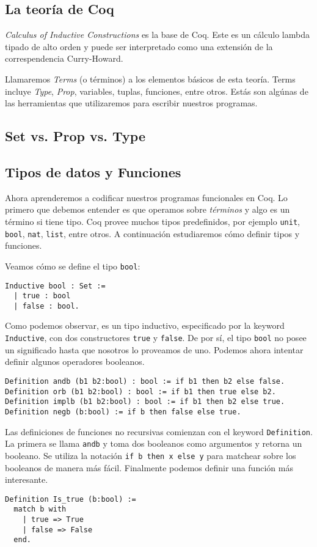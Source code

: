 \subsection{La teoría de Coq}

\textit{Calculus of Inductive Constructions} es la base de Coq. Este es un cálculo lambda tipado de alto orden y puede ser interpretado como una extensión de la correspendencia Curry-Howard.

Llamaremos \textit{Terms} (o términos) a los elementos básicos de esta teoría. Terms incluye \textit{Type}, \textit{Prop}, variables, tuplas, funciones, entre otros. Estás son algúnas de las herramientas que utilizaremos para escribir nuestros programas.

\subsection{Set vs. Prop vs. Type}

\subsection{Tipos de datos y Funciones}

Ahora aprenderemos a codificar nuestros programas funcionales en Coq. Lo primero que debemos entender es que operamos sobre \textit{términos} y algo es un término si tiene tipo. Coq provee muchos tipos predefinidos, por ejemplo \lstinline{unit}, \lstinline{bool}, \lstinline{nat}, \lstinline{list}, entre otros. A continuación estudiaremos cómo definir tipos y funciones.

Veamos cómo se define el tipo \lstinline{bool}:
\begin{lstlisting}
Inductive bool : Set :=
  | true : bool
  | false : bool.
\end{lstlisting}
Como podemos observar, es un tipo inductivo, especificado por la keyword \lstinline{Inductive}, con dos constructores \lstinline{true} y \lstinline{false}. De por sí, el tipo \lstinline{bool} no posee un significado hasta que nosotros lo proveamos de uno. Podemos ahora intentar definir algunos operadores booleanos.
\begin{lstlisting}
Definition andb (b1 b2:bool) : bool := if b1 then b2 else false.
Definition orb (b1 b2:bool) : bool := if b1 then true else b2.
Definition implb (b1 b2:bool) : bool := if b1 then b2 else true.
Definition negb (b:bool) := if b then false else true.
\end{lstlisting}
Las definiciones de funciones no recursivas comienzan con el keyword \lstinline{Definition}. La primera se llama \lstinline{andb} y toma dos booleanos como argumentos y retorna un booleano. Se utiliza la notación \lstinline{if b then x else y} para matchear sobre los booleanos de manera más fácil. Finalmente podemos definir una función más interesante.
\begin{lstlisting}
Definition Is_true (b:bool) :=
  match b with
    | true => True
    | false => False
  end.
\end{lstlisting}

